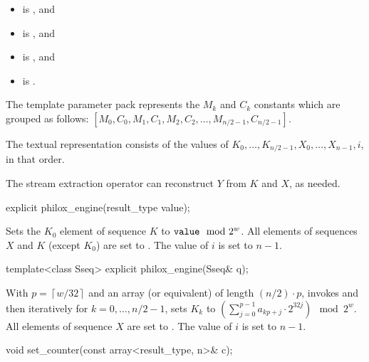 \pnum
\mandates
\begin{itemize}
\item {} is , and
\item {} is , and
\item {} is , and
\item {} is .
\end{itemize}

\pnum
The template parameter pack  represents
the $M_k$ and $C_k$ constants which are grouped as follows:
$[ M_0, C_0, M_1, C_1, M_2, C_2, \dotsc, M_{n/2 - 1}, C_{n/2 - 1} ]$.

\pnum
The textual representation consists of the values of
$K_0, \dotsc, K_{n/2 - 1}, X_{0}, \dotsc, X_{n - 1}, i$, in that order.
\begin{note}
The stream extraction operator can reconstruct $Y$ from $K$ and $X$, as needed.
\end{note}

\begin{itemdecl}
explicit philox_engine(result_type value);
\end{itemdecl}

\begin{itemdescr}
\pnum
\effects
Sets the $K_0$ element of sequence $K$ to $\texttt{\protect value} \mod 2^w$.
All elements of sequences $X$ and $K$ (except $K_0$) are set to .
The value of $i$ is set to $n - 1$.
\end{itemdescr}

\begin{itemdecl}
template<class Sseq> explicit philox_engine(Sseq& q);
\end{itemdecl}

\begin{itemdescr}
\pnum
\effects
With $p = \left\lceil w / 32 \right\rceil$ and
an array (or equivalent)  of length $(n/2) \cdot p$,
invokes  and
then iteratively for $k = 0, \dotsc, n/2 - 1$,
sets $K_k$ to
$\left(\sum_{j = 0}^{p - 1} a_{k p + j} \cdot 2^{32j} \right) \mod 2^w$.
All elements of sequence $X$ are set to .
The value of $i$ is set to $n - 1$.
\end{itemdescr}

%
\begin{itemdecl}
void set_counter(const array<result_type, n>& c);
\end{itemdecl}


